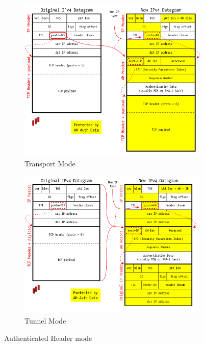 \documentclass[12pt]{article}
\begin{document}
\begin{figure}[h!]
        \centering
        \begin{subfigure}[b]{0.45\textwidth}
                \centering
                \includegraphics[width=\textwidth]{AH-1.png}
                \caption{Transport Mode}
                \end{subfigure}
        \qquad
        \begin{subfigure}[b]{0.45\textwidth}
                \centering
                \includegraphics[width=\textwidth]{AH-2.png}
                \caption{Tunnel Mode}
                \end{subfigure}
        \caption{Authenticated Header mode}
\end{figure}
\end{document}
